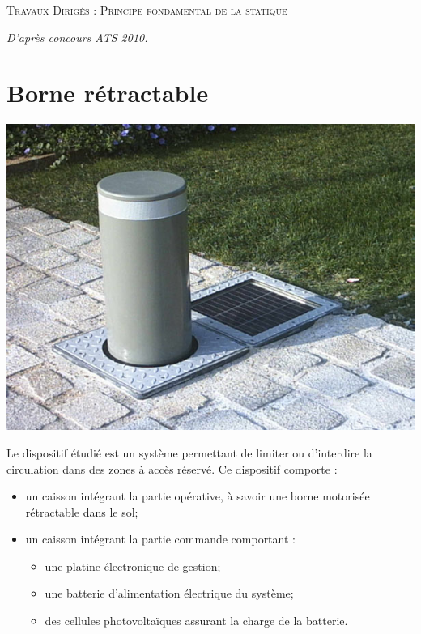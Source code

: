 \documentclass[10pt]{article}
\begin{document}

\begin{center}
\Large{\textsc{Travaux Dirigés : Principe fondamental de la statique}}
\end{center}
\begin{flushright}
\textit{D'après concours ATS 2010.}
\end{flushright}
\vspace{.5cm}

\section*{Borne rétractable}
\begin{minipage}[c]{.4\linewidth}
\begin{center}
\includegraphics[width=.8\textwidth]{images/borne}
\end{center}
\end{minipage} \hfill
\begin{minipage}[c]{.59\linewidth}
Le dispositif étudié est un système permettant de limiter ou d’interdire la circulation
dans des zones à accès réservé. Ce dispositif comporte :
\begin{itemize}
\item un caisson intégrant la partie opérative, à savoir une borne motorisée rétractable dans le sol;
\item un caisson intégrant la partie commande comportant :
\begin{itemize}
\item une platine électronique de gestion;
\item une batterie d’alimentation électrique du système;
\item des cellules photovoltaïques assurant la charge de la batterie.
\end{itemize}
\end{itemize}
\end{minipage} 
\end{document}
